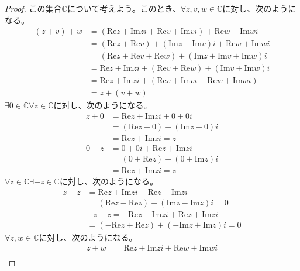 \documentclass[dvipdfmx]{jsarticle}
\begin{document}
\begin{proof}
この集合$\mathbb{C}$について考えよう。このとき、$\forall z,v,w \in \mathbb{C}$に対し、次のようになる。
\begin{align*}
(z + v) + w &= \left( \mathrm{Re}z + \mathrm{Im}zi + \mathrm{Re}v + \mathrm{Im}vi \right) + \mathrm{Re}w + \mathrm{Im}wi\\
&= \left( \mathrm{Re}z + \mathrm{Re}v \right) + \left( \mathrm{Im}z + \mathrm{Im}v \right)i + \mathrm{Re}w + \mathrm{Im}wi\\
&= \left( \mathrm{Re}z + \mathrm{Re}v + \mathrm{Re}w \right) + \left( \mathrm{Im}z + \mathrm{Im}v + \mathrm{Im}w \right)i\\
&= \mathrm{Re}z + \mathrm{Im}zi + \left( \mathrm{Re}v + \mathrm{Re}w \right) + \left( \mathrm{Im}v + \mathrm{Im}w \right)i\\
&= \mathrm{Re}z + \mathrm{Im}zi + \left( \mathrm{Re}v + \mathrm{Im}vi + \mathrm{Re}w + \mathrm{Im}wi \right)\\
&= z + (v + w)
\end{align*}
$\exists 0 \in \mathbb{C}\forall z \in \mathbb{C}$に対し、次のようになる。
\begin{align*}
z + 0 &= \mathrm{Re}z + \mathrm{Im}zi + 0 + 0i\\
&= \left( \mathrm{Re}z + 0 \right) + \left( \mathrm{Im}z + 0 \right)i\\
&= \mathrm{Re}z + \mathrm{Im}zi = z\\
0 + z &= 0 + 0i + \mathrm{Re}z + \mathrm{Im}zi\\
&= \left( 0 + \mathrm{Re}z \right) + \left( 0 + \mathrm{Im}z \right)i\\
&= \mathrm{Re}z + \mathrm{Im}zi = z
\end{align*}
$\forall z \in \mathbb{C}\exists - z \in \mathbb{C}$に対し、次のようになる。
\begin{align*}
z - z &= \mathrm{Re}z + \mathrm{Im}zi - \mathrm{Re}z - \mathrm{Im}zi\\
&= \left( \mathrm{Re}z - \mathrm{Re}z \right) + \left( \mathrm{Im}z - \mathrm{Im}z \right)i = 0\\
&- z + z = - \mathrm{Re}z - \mathrm{Im}zi + \mathrm{Re}z + \mathrm{Im}zi\\
&= \left( - \mathrm{Re}z + \mathrm{Re}z \right) + \left( - \mathrm{Im}z + \mathrm{Im}z \right)i = 0
\end{align*}
$\forall z,w \in \mathbb{C}$に対し、次のようになる。
\begin{align*}
z + w &= \mathrm{Re}z + \mathrm{Im}zi + \mathrm{Re}w + \mathrm{Im}wi\\

\end{align*}
\end{proof}
\end{document}
